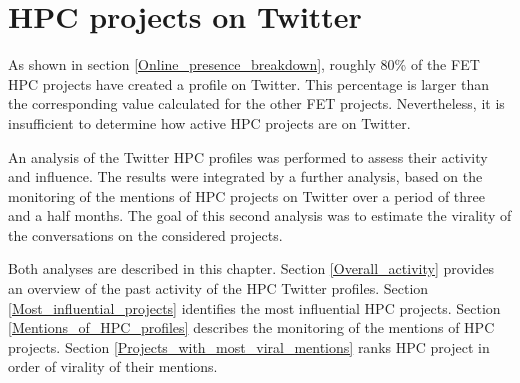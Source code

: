 \chapter{HPC projects on Twitter} \label{HPC_projects_on_Twitter}
As shown in section \ref{Online_presence_breakdown}, roughly 80\% of the FET HPC projects have created a profile on Twitter. This percentage is larger than the corresponding value calculated for the other FET projects. Nevertheless, it is insufficient to determine how active HPC projects are on Twitter. 

An analysis of the Twitter HPC profiles was performed to assess their activity and influence. The results were integrated by a further analysis, based on the monitoring of the mentions of HPC projects on Twitter over a period of three and a half months. The goal of this second analysis was to estimate the virality of the conversations on the considered projects.  

Both analyses are described in this chapter. Section \ref{Overall_activity} provides an overview of the past activity of the HPC Twitter profiles. Section \ref{Most_influential_projects} identifies the most influential HPC projects. Section \ref{Mentions_of_HPC_profiles} describes the monitoring of the mentions of HPC projects. Section \ref{Projects_with_most_viral_mentions} ranks HPC project in order of virality of their mentions. 

